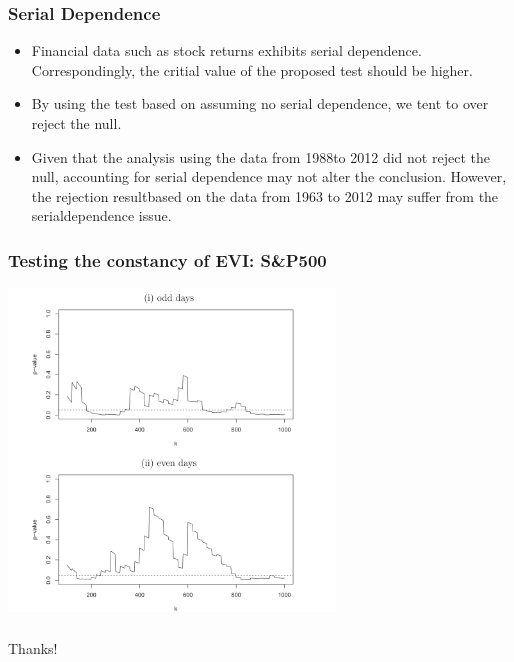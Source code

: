 \documentclass{beamer}
\begin{document}
\begin{frame}
    \frametitle{Serial Dependence}
\begin{itemize}
    \item Financial data such as stock returns exhibits serial dependence. Correspondingly, the critial value of the proposed test should be higher.
    \bigskip
    \item By using the test based on assuming no serial dependence, we tent to over reject the null.
    \bigskip
    \item Given that the analysis using the data from 1988to 2012 did not reject the null, accounting for serial dependence may not alter the conclusion. However, the rejection resultbased on the data from 1963 to 2012 may suffer from the serialdependence issue. 
\end{itemize}
    

\end{frame}

\begin{frame}
    \frametitle{Testing the constancy of EVI: S\&P500}

    \begin{center}
        \includegraphics[width=0.65\textwidth]{Figure6}
    \end{center}

\end{frame}

\begin{frame}
    \frametitle{}
\begin{center}
    \LARGE Thanks!
\end{center}
    

\end{frame}
\end{document}

